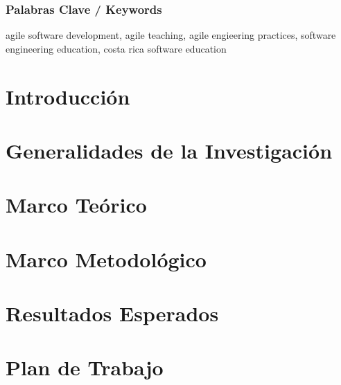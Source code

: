 \documentclass[12pt, twoside]{report}
\begin{document}
\subsection*{Palabras Clave / Keywords}
agile software development, agile teaching, agile engieering practices, software engineering education, costa rica software education



\chapter*{Introducción}


\chapter{Generalidades de la Investigación}


\chapter{Marco Teórico} \label{ch2:marco-teorico}


\chapter{Marco Metodológico}



\chapter{Resultados Esperados}


\chapter{Plan de Trabajo}




% 
% 
% 
% 
% 
% 
% 
% 
 
\end{document}
